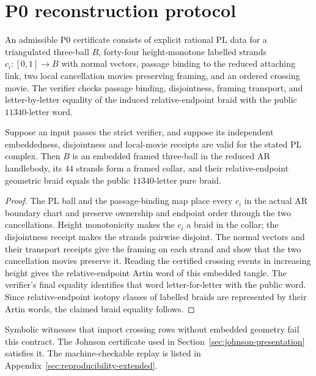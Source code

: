\section{P0 reconstruction protocol}\label{app:p0-reconstruction}

An admissible P0 certificate consists of explicit rational PL data for a
triangulated three-ball $B$, forty-four height-monotone labelled strands
$c_i:[0,1]\to B$ with normal vectors, passage binding to the reduced
attaching link, two local cancellation movies preserving framing, and an
ordered crossing movie.  The verifier checks passage binding, disjointness,
framing transport, and letter-by-letter equality of the induced
relative-endpoint braid with the public $11340$-letter word.

\begin{lemma}
Suppose an input passes the strict verifier, and suppose its independent
embeddedness, disjointness and local-movie receipts are valid for the stated
PL complex.  Then $B$ is an embedded framed three-ball in the reduced AR
handlebody, its $44$ strands form a framed collar, and their relative-endpoint
geometric braid equals the public $11340$-letter pure braid.
\end{lemma}

\begin{proof}
The PL ball and the passage-binding map place every $c_i$ in the actual AR
boundary chart and preserve ownership and endpoint order through the two
cancellations.  Height monotonicity makes the $c_i$ a braid in the collar;
the disjointness receipt makes the strands pairwise disjoint.  The normal
vectors and their transport receipts give the framing on each strand and
show that the two cancellation movies preserve it.  Reading the certified
crossing events in increasing height gives the relative-endpoint Artin word
of this embedded tangle.  The verifier's final equality identifies that word
letter-for-letter with the public word.  Since relative-endpoint isotopy
classes of labelled braids are represented by their Artin words, the claimed
braid equality follows.
\end{proof}

\begin{remark}
Symbolic witnesses that import crossing rows without embedded geometry fail
this contract.  The Johnson certificate used in Section~\ref{sec:johnson-presentation}
satisfies it.  The machine-checkable replay is listed in
Appendix~\ref{sec:reproducibility-extended}.
\end{remark}
